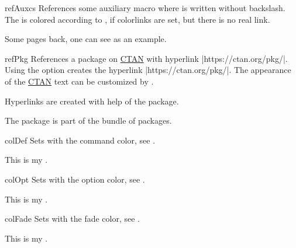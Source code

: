 \begin{docCommand}[doc updated=2020-02-11]{refAuxcs}{}
  References some auxiliary macro  where  is
  written without backslash.
  The  is colored according to ,
  if  colorlinks are set, but there is no real link.
\begin{dispExample}
Some pages back, one can see  as an example.
\end{dispExample}
\end{docCommand}


\begin{docCommand}[doc new and updated={2024-09-18}{2024-11-29}]{refPkg}{}
  References a package  on \href{https://ctan.org}{CTAN} with
  hyperlink \mbox{|https://ctan.org/pkg/|}.
  Using the option  creates the hyperlink
  \mbox{|https://ctan.org/pkg/|}.
  The appearance of the \href{https://ctan.org}{CTAN} text can be
  customized by .
\begin{dispExample}
Hyperlinks are created with help of the  package.\par
The package  is part of the
 bundle of packages.
\end{dispExample}
\end{docCommand}


\clearpage

\begin{docCommand}{colDef}{}
Sets  with the command color, see .
\begin{dispExample}
This is my .
\end{dispExample}
\end{docCommand}

\begin{docCommand}{colOpt}{}
  Sets  with the option color, see .
\begin{dispExample}
This is my .
\end{dispExample}
\end{docCommand}

\begin{docCommand}[doc new=2019-09-18]{colFade}{}
  Sets  with the fade color, see .
\begin{dispExample}
This is my .
\end{dispExample}
\end{docCommand}


